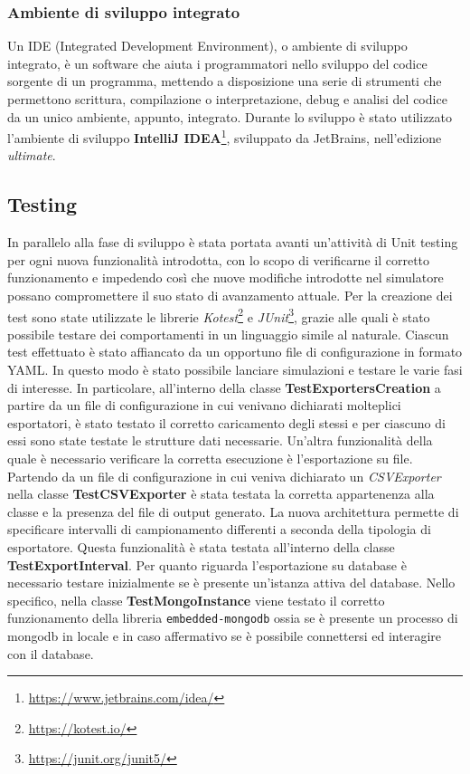 \documentclass[12pt,a4paper,openright,oneside]{book}
\begin{document}
\subsubsection{Ambiente di sviluppo integrato}
    Un IDE (Integrated Development Environment), o ambiente di sviluppo integrato, è un software che aiuta i programmatori nello sviluppo del codice sorgente di un programma, mettendo a disposizione una serie di strumenti che permettono scrittura, compilazione o interpretazione, debug e analisi del codice da un unico ambiente, appunto, integrato.
    Durante lo sviluppo è stato utilizzato l'ambiente di sviluppo \textbf{IntelliJ IDEA}\footnote{\url{https://www.jetbrains.com/idea/}}, sviluppato da JetBrains, nell'edizione \textit{ultimate}.
    
\subsection{Testing}
    In parallelo alla fase di sviluppo è stata portata avanti un’attività di Unit testing per ogni nuova funzionalità introdotta, con lo scopo di verificarne il corretto funzionamento e impedendo così che nuove modifiche introdotte nel simulatore possano compromettere il suo stato di avanzamento attuale.
    Per la creazione dei test sono state utilizzate le librerie \textit{Kotest}\footnote{\url{https://kotest.io/}} e \textit{JUnit}\footnote{\url{https://junit.org/junit5/}}, grazie alle quali è stato possibile testare dei comportamenti in un linguaggio simile al naturale.
    Ciascun test effettuato è stato affiancato da un opportuno file di configurazione in formato YAML. In questo modo è stato possibile lanciare simulazioni e testare le varie fasi di interesse.
    In particolare, all'interno della classe \textbf{TestExportersCreation} a partire da un file di configurazione in cui venivano dichiarati molteplici esportatori, è stato testato il corretto caricamento degli stessi e per ciascuno di essi sono state testate le strutture dati necessarie. 
    Un'altra funzionalità della quale è necessario verificare la corretta esecuzione è l'esportazione su file. Partendo da un file di configurazione in cui veniva dichiarato un \textit{CSVExporter} nella classe \textbf{TestCSVExporter} è stata testata la corretta appartenenza alla classe e la presenza del file di output generato.
    La nuova architettura permette di specificare intervalli di campionamento differenti a seconda della tipologia di esportatore. Questa funzionalità è stata testata all'interno della classe \textbf{TestExportInterval}.
    Per quanto riguarda l'esportazione su database è necessario testare inizialmente se è presente un'istanza attiva del database. Nello specifico, nella classe \textbf{TestMongoInstance} viene testato il corretto funzionamento della libreria \texttt{embedded-mongodb} ossia se è presente un processo di mongodb in locale e in caso affermativo se è possibile connettersi ed interagire con il database. 
\end{document}
